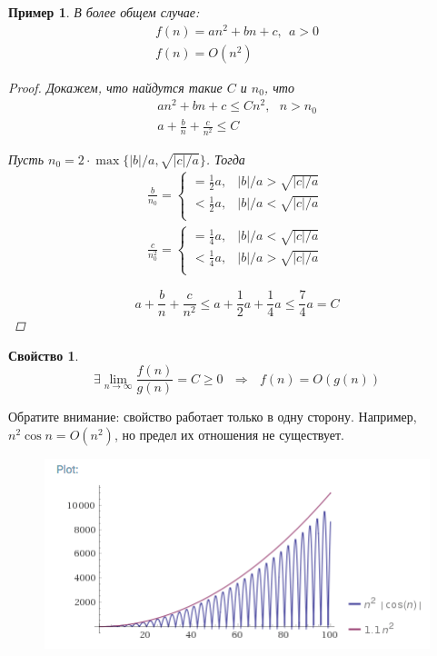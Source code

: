 \documentclass[12pt,a4paper]{report}
\providecommand{\abs}[1]{\left\lvert{#1}\right\rvert}
\newtheorem*{example}{Пример}
\newtheorem*{property}{Свойство}
\begin{document}
\begin{example}
В более общем случае:
$$
  \begin{gathered}
  f(n) = an^2 + bn + c,~~ a > 0\\
  f(n)=O(n^2)
  \end{gathered}
$$

\begin{proof}
Докажем, что найдутся такие $C$ и $n_0$, что
$$
  \begin{gathered}
  an^2 + bn + c \leqslant C n^2,~~~n>n_0\\
  a + \frac{b}{n}  + \frac{c}{n^2} \leqslant C
  \end{gathered}
$$

Пусть $n_0 = 2 \cdot \max\{\abs{b}/a, \sqrt{\abs{c}/a}\}$. Тогда
$$
  \begin{gathered}
    \frac{b}{n_0} = \begin{cases}
    = \frac{1}{2} a, & \abs{b}/a > \sqrt{\abs{c}/a}\ \\
    < \frac{1}{2} a, & \abs{b}/a < \sqrt{\abs{c}/a}\ \\
    \end{cases} \\
    \frac{c}{n^2_0} = \begin{cases}
    = \frac{1}{4} a, & \abs{b}/a < \sqrt{\abs{c}/a}\ \\
    < \frac{1}{4} a, & \abs{b}/a > \sqrt{\abs{c}/a}\ \\
    \end{cases}
  \end{gathered}
$$

$$
a + \frac{b}{n}  + \frac{c}{n^2}  \leqslant a + \frac{1}{2} a + \frac{1}{4} a \leqslant \boxed{\frac{7}{4} a = C}
$$
\end{proof}
\end{example}


\begin{property}
$$
\boxed{
  \exists \lim_{n\to\infty} \frac{f(n)}{g(n)} = C \geqslant 0   ~~~\Rightarrow~~~   f(n) = O(g(n))
}
$$
\end{property}


Обратите внимание: свойство работает только в одну сторону. Например, $n^2\cos n = O(n^2)$, но предел их отношения не существует.

\begin{figure}[!ht]
\centering
\includegraphics{cos.png}
\end{figure}
\end{document}
